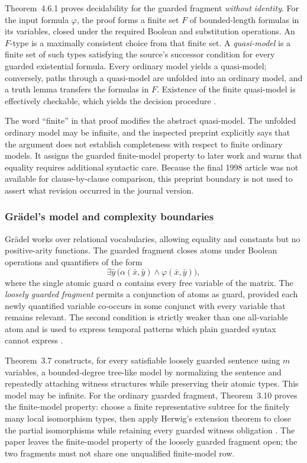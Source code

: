 Theorem~4.6.1 proves decidability for the guarded fragment \emph{without
identity}.  For the input formula \(\varphi\), the proof forms a finite set
\(F\) of bounded-length formulas in its variables, closed under the required
Boolean and substitution operations.  An \(F\)-type is a maximally consistent
choice from that finite set.  A \emph{quasi-model} is a finite set of such
types satisfying the source's successor condition for every guarded
existential formula.  Every ordinary model yields a quasi-model; conversely,
paths through a quasi-model are unfolded into an ordinary model, and a truth
lemma transfers the formulas in \(F\).  Existence of the finite quasi-model is
effectively checkable, which yields the decision procedure
\cite[\S4.6]{AndrekaVanBenthemNemeti1998}.

The word ``finite'' in that proof modifies the abstract quasi-model.  The
unfolded ordinary model may be infinite, and the inspected preprint explicitly
says that the argument does not establish completeness with respect to finite
ordinary models.  It assigns the guarded finite-model property to later work
and warns that equality requires additional syntactic care.  Because the final
1998 article was not available for clause-by-clause comparison, this preprint
boundary is not used to assert what revision occurred in the journal version.

\subsubsection{Gr\"adel's model and complexity boundaries}

Gr\"adel works over relational vocabularies, allowing equality and constants
but no positive-arity functions.  The guarded fragment closes atoms under
Boolean operations and quantifiers of the form
\[
 \exists\bar y\,
 \bigl(\alpha(\bar x,\bar y)\land
       \varphi(\bar x,\bar y)\bigr),
\]
where the single atomic guard \(\alpha\) contains every free variable of the
matrix.  The \emph{loosely guarded fragment} permits a conjunction of atoms as
guard, provided each newly quantified variable co-occurs in some conjunct
with every variable that remains relevant.  The second condition is strictly
weaker than one all-variable atom and is used to express temporal patterns
which plain guarded syntax cannot express \cite[defs.~2.1--2.2]{Gradel1999}.

Theorem~3.7 constructs, for every satisfiable loosely guarded sentence using
\(m\) variables, a bounded-degree tree-like model by normalizing the sentence
and repeatedly attaching witness structures while preserving their atomic
types.  This model may be infinite.  For the ordinary guarded fragment,
Theorem~3.10 proves the finite-model property: choose a finite representative
subtree for the finitely many local isomorphism types, then apply Herwig's
extension theorem to close the partial isomorphisms while retaining every
guarded witness obligation \cite[\S3]{Gradel1999}.  The paper leaves the
finite-model property of the loosely guarded fragment open; the two fragments
must not share one unqualified finite-model row.

